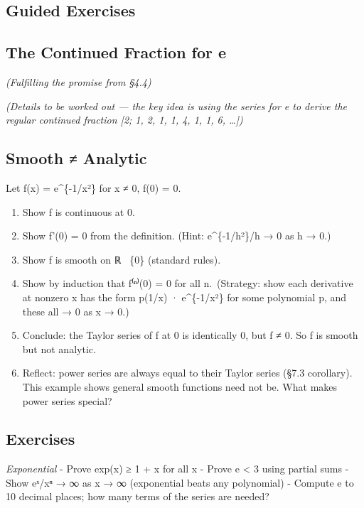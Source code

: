 \documentclass[
  10pt,
  letterpaper,
]{scrbook}
\begin{document}
\subsection{Guided Exercises}\label{guided-exercises-14}

\subsection{The Continued Fraction for
e}\label{the-continued-fraction-for-e}

\emph{(Fulfilling the promise from §4.4)}

\emph{(Details to be worked out --- the key idea is using the series for
e to derive the regular continued fraction {[}2; 1, 2, 1, 1, 4, 1, 1, 6,
\ldots{]})}

\subsection{Smooth ≠ Analytic}\label{smooth-analytic}

Let f(x) = e\^{}\{-1/x²\} for x ≠ 0, f(0) = 0.

\begin{enumerate}
\def\labelenumi{(\alph{enumi})}
\item
  Show f is continuous at 0.
\item
  Show f'(0) = 0 from the definition. (Hint: e\^{}\{-1/h²\}/h → 0 as h →
  0.)
\item
  Show f is smooth on ℝ ~\{0\} (standard rules).
\item
  Show by induction that f⁽ⁿ⁾(0) = 0 for all n.~(Strategy: show each
  derivative at nonzero x has the form p(1/x) · e\^{}\{-1/x²\} for some
  polynomial p, and these all → 0 as x → 0.)
\item
  Conclude: the Taylor series of f at 0 is identically 0, but f ≠ 0. So
  f is smooth but not analytic.
\item
  Reflect: power series are always equal to their Taylor series (§7.3
  corollary). This example shows general smooth functions need not be.
  What makes power series special?
\end{enumerate}

\subsection{Exercises}\label{exercises-32}

\emph{Exponential} - Prove exp(x) ≥ 1 + x for all x - Prove e
\textless{} 3 using partial sums - Show eˣ/xⁿ → ∞ as x → ∞ (exponential
beats any polynomial) - Compute e to 10 decimal places; how many terms
of the series are needed?
\end{document}
